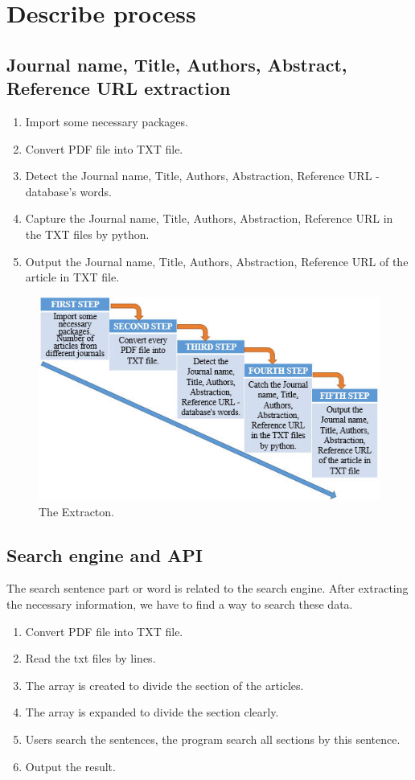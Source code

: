 \section*{Describe process}
	\subsection*{Journal name, Title, Authors, Abstract, Reference URL extraction}
		\begin{enumerate}
			\item Import some necessary packages.
			\item Convert PDF file into TXT file.
			\item Detect the Journal name, Title, Authors, Abstraction, Reference URL -database's words.
			\item Capture the Journal name, Title, Authors, Abstraction, Reference URL  in the TXT files by python.
			\item Output the Journal name, Title, Authors, Abstraction, Reference URL  of the article in TXT file.
		\end{enumerate}	

\begin{figure}[tbh]
	\begin{center}
		\includegraphics[width=\columnwidth]{Union_Method_Chart_Extraction}
	\end{center}
	\caption{The Extracton.}
\end{figure}

	\subsection*{Search engine and API}
	The search sentence part or word is related to the search engine. 
	After extracting the necessary information, we have to find a way to search these data.
		\begin{enumerate}
			\item Convert PDF file into TXT file.
			\item Read the txt files by lines.
			\item The array is created to divide the section of the articles.
			\item The array is expanded to divide the section clearly.
			\item Users search the sentences, the program search all sections by this sentence.
			\item Output the result.
		\end{enumerate}	

